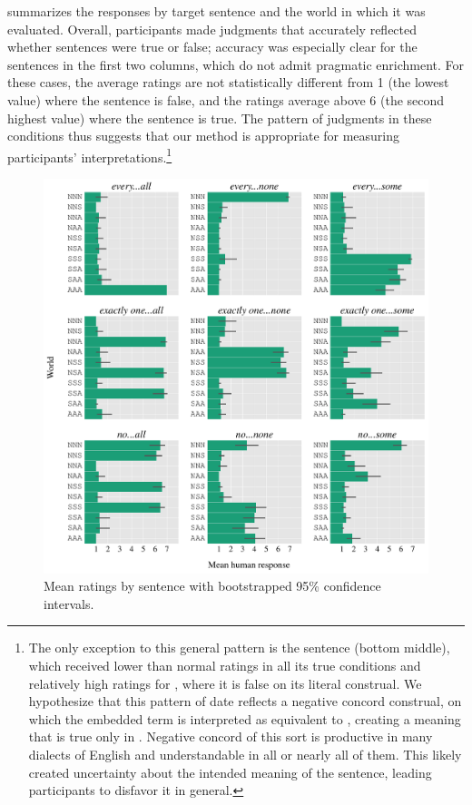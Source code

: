 \documentclass[leqno,12pt]{article}
\begin{document}

 summarizes the responses by target sentence
and the world in which it was evaluated. Overall, participants made judgments that accurately reflected whether sentences were true or false; accuracy was
especially clear for the sentences in the first two columns, which do
not admit pragmatic enrichment. For these cases, the average ratings are not
statistically different from 1 (the lowest value) where the sentence
is false, and the ratings average above 6 (the second highest value)
where the sentence is true. The pattern of judgments in these
conditions thus suggests that our method is appropriate for measuring
participants' interpretations.\footnote{The only exception to this general pattern is the sentence  (bottom middle), which received lower than normal
ratings in all its true conditions and relatively high ratings for
, where it is false on its literal construal. We
hypothesize that this pattern of date reflects a
negative concord construal, on which the embedded term is interpreted
as equivalent to , creating a meaning that is
true only in . Negative concord of this sort is productive
in many dialects of English and understandable in all or nearly all of
them. This likely created uncertainty about the intended meaning of
the sentence, leading participants to disfavor it in general.}

\begin{figure}[!ht]
  \centering
  \includegraphics[width=1\textwidth]{fig/basketball-pilot-2-11-14-results-parsed}
  \caption{Mean ratings by sentence with bootstrapped 95\% confidence intervals.}
  \label{fig:exp1-results}
\end{figure}
\end{document}
